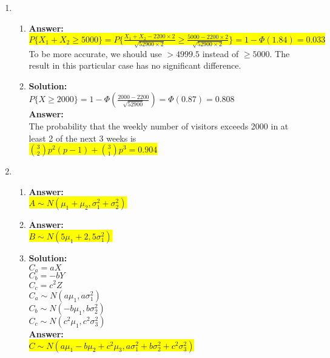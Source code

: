 \documentclass{article}
\newcommand{\myansw}{\textbf{Answer:}\\}
\newcommand{\mysolu}{\textbf{Solution:}\\}
\begin{document}
\begin{enumerate}
\begin{enumerate}
	\end{enumerate}
	\item 
	\begin{enumerate}
		\item
		\myansw
		\colorbox{yellow}{${P\{X_1 + X_2 \geq 5000\} = P\{\frac{X_1+X_2 - 2200 \times 2}{\sqrt{52900 \times 2}} \geq \frac{5000 - 2200 \times 2}{\sqrt{52900 \times 2}} \}
		=1-\Phi (1.84) = 0.033}$}\\
		To be more accurate, we should use ${> 4999.5}$ instead of ${\geq 5000}$. The result in this particular case has no significant difference.
		\item
		\mysolu
		${P\{X \geq 2000  \} = 1 - \Phi(\frac{2000 - 2200}{\sqrt{52900}})=  \Phi(0.87) = 0.808}$\\
		\myansw
		The probability that the weekly number of visitors exceeds 2000 in at least 2 of the next 3 weeks is\\
		\colorbox{yellow}{${{3 \choose 2}p^2(p-1)+{3 \choose 1}p^3}=0.904$}\\
	\end{enumerate}
	\item
	\begin{enumerate}
		\item
		\myansw
		\colorbox{yellow}{${A \sim N(\mu_1+\mu_2, \sigma_1^2+\sigma_2^2)}$}\\
		\item
		\myansw
		\colorbox{yellow}{${B \sim N(5\mu_1+2, 5\sigma_1^2)}$}\\
		\item 
		\mysolu
		${C_a = aX}$\\
		${C_b = -bY}$\\
		${C_c = c^2Z}$\\
		${C_a \sim N(a\mu_1, a\sigma_1^2)}$\\
		${C_b \sim N(-b\mu_1, b\sigma_2^2)}$\\
		${C_c \sim N(c^2\mu_1, c^2\sigma_3^2)}$\\
		\myansw
		\colorbox{yellow}{${C \sim N(a\mu_1 - b\mu_2 + c^2\mu_3, a\sigma_1^2+b\sigma_2^2+c^2\sigma_3^2)}$}\\
		

\end{enumerate}
\end{enumerate}
\end{document}
